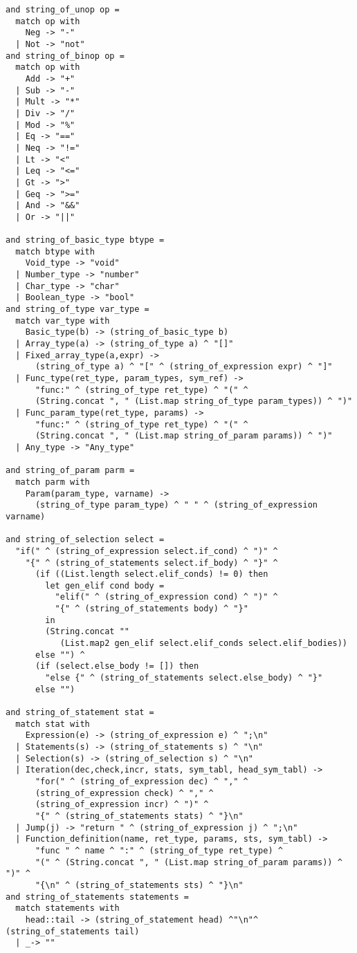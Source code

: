 \begin{verbatim}
and string_of_unop op =
  match op with
    Neg -> "-"
  | Not -> "not"
and string_of_binop op =
  match op with
    Add -> "+"
  | Sub -> "-"
  | Mult -> "*"
  | Div -> "/"
  | Mod -> "%"
  | Eq -> "=="
  | Neq -> "!="
  | Lt -> "<"
  | Leq -> "<="
  | Gt -> ">"
  | Geq -> ">="
  | And -> "&&"
  | Or -> "||"

and string_of_basic_type btype =
  match btype with
    Void_type -> "void"
  | Number_type -> "number"
  | Char_type -> "char"
  | Boolean_type -> "bool"
and string_of_type var_type =
  match var_type with
    Basic_type(b) -> (string_of_basic_type b)
  | Array_type(a) -> (string_of_type a) ^ "[]"
  | Fixed_array_type(a,expr) ->
      (string_of_type a) ^ "[" ^ (string_of_expression expr) ^ "]"
  | Func_type(ret_type, param_types, sym_ref) ->
      "func:" ^ (string_of_type ret_type) ^ "(" ^
      (String.concat ", " (List.map string_of_type param_types)) ^ ")"
  | Func_param_type(ret_type, params) ->
      "func:" ^ (string_of_type ret_type) ^ "(" ^
      (String.concat ", " (List.map string_of_param params)) ^ ")"
  | Any_type -> "Any_type"

and string_of_param parm =
  match parm with
    Param(param_type, varname) ->
      (string_of_type param_type) ^ " " ^ (string_of_expression varname)

and string_of_selection select =
  "if(" ^ (string_of_expression select.if_cond) ^ ")" ^
    "{" ^ (string_of_statements select.if_body) ^ "}" ^
      (if ((List.length select.elif_conds) != 0) then
        let gen_elif cond body =
          "elif(" ^ (string_of_expression cond) ^ ")" ^
          "{" ^ (string_of_statements body) ^ "}"
        in 
        (String.concat ""
           (List.map2 gen_elif select.elif_conds select.elif_bodies))
      else "") ^
      (if (select.else_body != []) then
        "else {" ^ (string_of_statements select.else_body) ^ "}"
      else "")

and string_of_statement stat =
  match stat with
    Expression(e) -> (string_of_expression e) ^ ";\n"
  | Statements(s) -> (string_of_statements s) ^ "\n"
  | Selection(s) -> (string_of_selection s) ^ "\n"
  | Iteration(dec,check,incr, stats, sym_tabl, head_sym_tabl) ->
      "for(" ^ (string_of_expression dec) ^ "," ^
      (string_of_expression check) ^ "," ^
      (string_of_expression incr) ^ ")" ^
      "{" ^ (string_of_statements stats) ^ "}\n"
  | Jump(j) -> "return " ^ (string_of_expression j) ^ ";\n"
  | Function_definition(name, ret_type, params, sts, sym_tabl) ->
      "func " ^ name ^ ":" ^ (string_of_type ret_type) ^
      "(" ^ (String.concat ", " (List.map string_of_param params)) ^ ")" ^
      "{\n" ^ (string_of_statements sts) ^ "}\n"
and string_of_statements statements =
  match statements with
    head::tail -> (string_of_statement head) ^"\n"^ (string_of_statements tail)
  | _-> ""


\end{verbatim}

